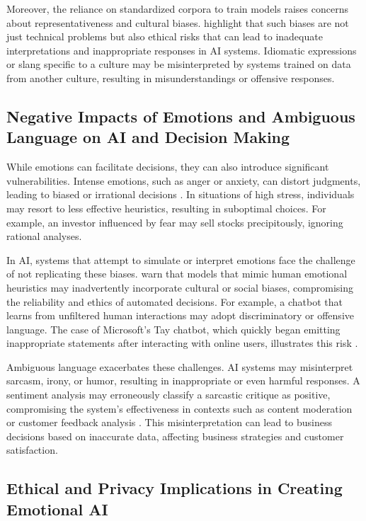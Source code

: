 \documentclass[a4paper,12pt]{report}
\begin{document}
	Moreover, the reliance on standardized corpora to train models raises concerns about representativeness and cultural biases. \textcite{gigerenzer2009} highlight that such biases are not just technical problems but also ethical risks that can lead to inadequate interpretations and inappropriate responses in AI systems. Idiomatic expressions or slang specific to a culture may be misinterpreted by systems trained on data from another culture, resulting in misunderstandings or offensive responses.
	
	\subsection{Negative Impacts of Emotions and Ambiguous Language on AI and Decision Making}
	
	While emotions can facilitate decisions, they can also introduce significant vulnerabilities. Intense emotions, such as anger or anxiety, can distort judgments, leading to biased or irrational decisions \parencite{bechara2000}. In situations of high stress, individuals may resort to less effective heuristics, resulting in suboptimal choices. For example, an investor influenced by fear may sell stocks precipitously, ignoring rational analyses.
	
	In AI, systems that attempt to simulate or interpret emotions face the challenge of not replicating these biases. \textcite{russell2020} warn that models that mimic human emotional heuristics may inadvertently incorporate cultural or social biases, compromising the reliability and ethics of automated decisions. For example, a chatbot that learns from unfiltered human interactions may adopt discriminatory or offensive language. The case of Microsoft's Tay chatbot, which quickly began emitting inappropriate statements after interacting with online users, illustrates this risk \parencite{neff2016}.
	
	Ambiguous language exacerbates these challenges. AI systems may misinterpret sarcasm, irony, or humor, resulting in inappropriate or even harmful responses. A sentiment analysis may erroneously classify a sarcastic critique as positive, compromising the system's effectiveness in contexts such as content moderation or customer feedback analysis \parencite{slovic2007}. This misinterpretation can lead to business decisions based on inaccurate data, affecting business strategies and customer satisfaction.
	
	\subsection{Ethical and Privacy Implications in Creating Emotional AI}
	
\end{document}
